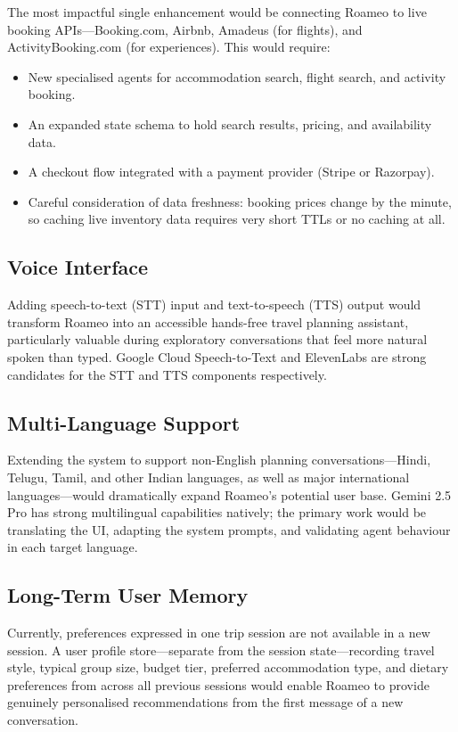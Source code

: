 \documentclass[12pt,a4paper]{report}
\begin{document}
The most impactful single enhancement would be connecting Roameo to live booking APIs---Booking.com, Airbnb, Amadeus (for flights), and ActivityBooking.com (for experiences). This would require:
\begin{itemize}[nosep]
  \item New specialised agents for accommodation search, flight search, and activity booking.
  \item An expanded state schema to hold search results, pricing, and availability data.
  \item A checkout flow integrated with a payment provider (Stripe or Razorpay).
  \item Careful consideration of data freshness: booking prices change by the minute, so caching live inventory data requires very short TTLs or no caching at all.
\end{itemize}

\subsection{Voice Interface}

Adding speech-to-text (STT) input and text-to-speech (TTS) output would transform Roameo into an accessible hands-free travel planning assistant, particularly valuable during exploratory conversations that feel more natural spoken than typed. Google Cloud Speech-to-Text and ElevenLabs are strong candidates for the STT and TTS components respectively.

\subsection{Multi-Language Support}

Extending the system to support non-English planning conversations---Hindi, Telugu, Tamil, and other Indian languages, as well as major international languages---would dramatically expand Roameo's potential user base. Gemini 2.5 Pro has strong multilingual capabilities natively; the primary work would be translating the UI, adapting the system prompts, and validating agent behaviour in each target language.

\subsection{Long-Term User Memory}

Currently, preferences expressed in one trip session are not available in a new session. A user profile store---separate from the session state---recording travel style, typical group size, budget tier, preferred accommodation type, and dietary preferences from across all previous sessions would enable Roameo to provide genuinely personalised recommendations from the first message of a new conversation.
\end{document}
